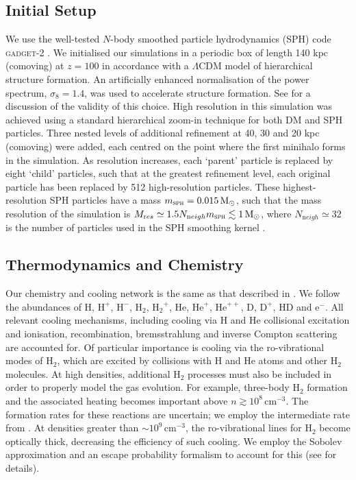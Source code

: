 \documentclass{thesis}
\newcommand{\cc}{\ensuremath{\,\mathrm{cm}^{-3}}\xspace}
\newcommand{\msun}{\ensuremath{\,\mathrm{M}_{\odot}}\xspace}
\newcommand{\htwo}{\ensuremath{\mathrm{H}_2}\xspace}
\newcommand{\hd}{\ensuremath{\mathrm{HD}}\xspace}
\newcommand{\deut}{\ensuremath{\mathrm{D}}\xspace}
\newcommand{\h}{\ensuremath{\mathrm{H}}\xspace}
\newcommand{\hplus}{\ensuremath{\mathrm{H}^+}\xspace}
\newcommand{\hminus}{\ensuremath{\mathrm{H}^-}\xspace}
\newcommand{\he}{\ensuremath{\mathrm{He}}\xspace}
\newcommand{\heplus}{\ensuremath{\mathrm{He}^+}\xspace}
\newcommand{\about}{\ensuremath{\sim}}
\begin{document}
\subsection{Initial Setup}
\label{setup}
We use the well-tested $N$-body smoothed particle hydrodynamics (SPH) code \textsc{gadget-2} \citep{Springel2005}. We initialised our simulations in a periodic box of length 140 kpc (comoving) at $z=100$ in accordance with a $\Lambda$CDM model of hierarchical structure formation. An artificially enhanced normalisation of the power spectrum, $\sigma_8 = 1.4$, was used to accelerate structure formation. See \citet{StacyGreifBromm2010} for a discussion of the validity of this choice. High resolution in this simulation was achieved using a standard hierarchical zoom-in technique for both DM and SPH particles. Three nested levels of additional refinement at 40, 30 and 20 kpc (comoving) were added, each centred on the point where the first minihalo forms in the simulation.  As resolution increases, each `parent' particle is replaced by eight `child' particles, such that at the greatest refinement level, each original particle has been replaced by 512 high-resolution particles.  These highest-resolution SPH particles have a mass $m_{\textsc{sph}} = 0.015\msun$, such that the mass resolution of the simulation is $M_{\mathrm res} \simeq 1.5 N_{\mathrm neigh} m_{\textsc{sph}} \lesssim 1\msun$, where $N_{\mathrm neigh} \simeq 32$ is the number of particles used in the SPH smoothing kernel \citep{BateBurkert1997}.

\subsection{Thermodynamics and Chemistry}
\label{chemistry}
Our chemistry and cooling network is the same as that described in \citet{Greifetal2009b}.  We follow the abundances of \h, \hplus, \hminus, \htwo, $\htwo^+$, \he, \heplus, $\he^{++}$, \deut, $\deut^+$, \hd and e$^-$.  All relevant cooling mechanisms, including cooling via \h and \he collisional excitation and ionisation, recombination, bremsstrahlung and inverse Compton scattering are accounted for.  Of particular importance is cooling via the ro-vibrational modes of \htwo, which are excited by collisions with \h and \he atoms and other \htwo molecules.  At high densities, additional \htwo processes must also be included in order to properly model the gas evolution.  For example, three-body \htwo formation and the associated heating becomes important above $n\gtrsim10^8$\cc \citep{Turketal2011}.  The formation rates for these reactions are uncertain; we employ the intermediate rate from \citet{PallaSalpeterStahler1983}. At densities greater than \about$10^9\cc$, the ro-vibrational lines for \htwo become optically thick, decreasing the efficiency of such cooling. We employ the Sobolev approximation and an escape probability formalism to account for this (see \citealt{Yoshidaetal2006, Greifetal2011} for details).
\end{document}
